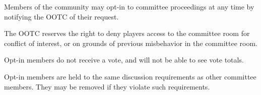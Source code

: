 \begin{deepEnumerate}
    \item Members of the community may opt-in to committee proceedings at any time by notifying the OOTC of their request.
    \begin{deepEnumerate}
        \item The OOTC reserves the right to deny players access to the committee room for conflict of interest, or on grounds of previous misbehavior in the committee room.
        \item Opt-in members do not receive a vote, and will not be able to see vote totals.
        \item Opt-in members are held to the same discussion requirements as other committee members. They may be removed if they violate such requirements.
    \end{deepEnumerate}
\end{deepEnumerate}
